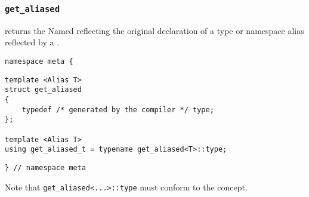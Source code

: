 

\subsubsection{\texttt{get\_aliased}}

returns the Named reflecting the original declaration of a type or namespace alias reflected by a .

\begin{verbatim}
namespace meta {
\end{verbatim}
\begin{verbatim}
template <Alias T>
struct get_aliased
{
	typedef /* generated by the compiler */ type;
};
	
template <Alias T>
using get_aliased_t = typename get_aliased<T>::type;

\end{verbatim}
\begin{verbatim}
} // namespace meta
\end{verbatim}


Note that \texttt{get\_aliased<...>::type}
must conform to the  concept.

